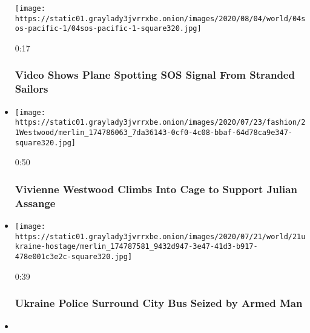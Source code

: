 \begin{itemize}
  \texttt{[image: https://static01.graylady3jvrrxbe.onion/images/2020/08/04/world/04sos-pacific-1/04sos-pacific-1-square320.jpg]}

  0:17

  \hypertarget{video-shows-plane-spotting-sos-signal-from-stranded-sailors}{%
  \subsubsection{Video Shows Plane Spotting SOS Signal From Stranded
  Sailors}\label{video-shows-plane-spotting-sos-signal-from-stranded-sailors}}
\item
  \href{https://www.nytimes3xbfgragh.onion/video/us/100000007249534/vivienne-westwood-canary-julian-assange.html?action=click\&module=video-series-bar\&region=header\&pgtype=Article\&playlistId=video/world}{}

  \texttt{[image: https://static01.graylady3jvrrxbe.onion/images/2020/07/23/fashion/21Westwood/merlin\_174786063\_7da36143-0cf0-4c08-bbaf-64d78ca9e347-square320.jpg]}

  0:50

  \hypertarget{vivienne-westwood-climbs-into-cage-to-support-julian-assange}{%
  \subsubsection{Vivienne Westwood Climbs Into Cage to Support Julian
  Assange}\label{vivienne-westwood-climbs-into-cage-to-support-julian-assange}}
\item
  \href{https://www.nytimes3xbfgragh.onion/video/us/100000007249315/hostages-on-ukraine-city-bus.html?action=click\&module=video-series-bar\&region=header\&pgtype=Article\&playlistId=video/world}{}

  \texttt{[image: https://static01.graylady3jvrrxbe.onion/images/2020/07/21/world/21ukraine-hostage/merlin\_174787581\_9432d947-3e47-41d3-b917-478e001c3e2c-square320.jpg]}

  0:39

  \hypertarget{ukraine-police-surround-city-bus-seized-by-armed-man}{%
  \subsubsection{Ukraine Police Surround City Bus Seized by Armed
  Man}\label{ukraine-police-surround-city-bus-seized-by-armed-man}}
\item
  \href{https://www.nytimes3xbfgragh.onion/video/world/europe/100000007237802/france-bastille-day-virus.html?action=click\&module=video-series-bar\&region=header\&pgtype=Article\&playlistId=video/world}{}


\end{itemize}
